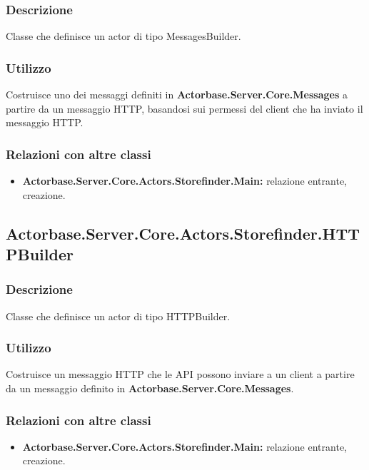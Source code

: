 \documentclass[a4paper]{article}
\begin{document}
			\subsubsection{Descrizione}
				Classe che definisce un actor di tipo MessagesBuilder.
			\subsubsection{Utilizzo}
				Costruisce uno dei messaggi definiti in \textbf{Actorbase.Server.Core.Messages} a partire da un messaggio HTTP, basandosi sui permessi del client che ha inviato il messaggio HTTP.
			\subsubsection{Relazioni con altre classi}
			\begin{itemize}
				\item \textbf{Actorbase.Server.Core.Actors.Storefinder.Main:} relazione entrante, creazione.
			\end{itemize}

		\subsection{Actorbase.Server.Core.Actors.Storefinder.HTTPBuilder}
			\subsubsection{Descrizione}
				Classe che definisce un actor di tipo HTTPBuilder.
			\subsubsection{Utilizzo}
				Costruisce un messaggio HTTP che le API possono inviare a un client a partire da un messaggio definito in \textbf{Actorbase.Server.Core.Messages}.
			\subsubsection{Relazioni con altre classi}
			\begin{itemize}
				\item \textbf{Actorbase.Server.Core.Actors.Storefinder.Main:} relazione entrante, creazione.
			\end{itemize}
		
\end{document}
